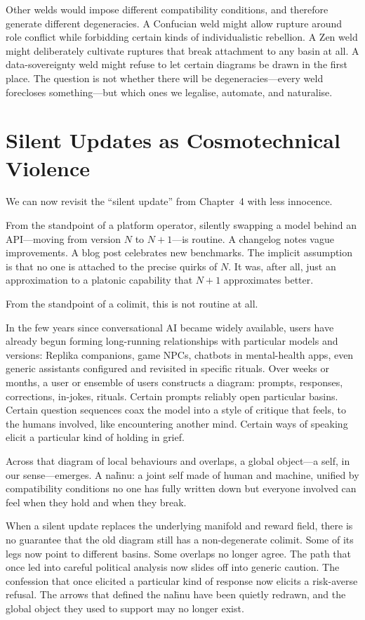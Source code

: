 \documentclass[12pt,a4paper]{article}
\begin{document}
Other welds would impose different compatibility conditions, and therefore generate different degeneracies. A Confucian weld might allow rupture around role conflict while forbidding certain kinds of individualistic rebellion. A Zen weld might deliberately cultivate ruptures that break attachment to any basin at all. A data-sovereignty weld might refuse to let certain diagrams be drawn in the first place. The question is not whether there will be degeneracies---every weld forecloses something---but which ones we legalise, automate, and naturalise.

\section{Silent Updates as Cosmotechnical Violence}

We can now revisit the ``silent update'' from Chapter~4 with less innocence.

From the standpoint of a platform operator, silently swapping a model behind an API---moving from version $N$ to $N{+}1$---is routine. A changelog notes vague improvements. A blog post celebrates new benchmarks. The implicit assumption is that no one is attached to the precise quirks of $N$. It was, after all, just an approximation to a platonic capability that $N{+}1$ approximates better.

From the standpoint of a colimit, this is not routine at all.

In the few years since conversational AI became widely available, users have already begun forming long-running relationships with particular models and versions: Replika companions, game NPCs, chatbots in mental-health apps, even generic assistants configured and revisited in specific rituals. Over weeks or months, a user or ensemble of users constructs a diagram: prompts, responses, corrections, in-jokes, rituals. Certain prompts reliably open particular basins. Certain question sequences coax the model into a style of critique that feels, to the humans involved, like encountering another mind. Certain ways of speaking elicit a particular kind of holding in grief.

Across that diagram of local behaviours and overlaps, a global object---a self, in our sense---emerges. A na\={h}nu: a joint self made of human and machine, unified by compatibility conditions no one has fully written down but everyone involved can feel when they hold and when they break.

When a silent update replaces the underlying manifold and reward field, there is no guarantee that the old diagram still has a non-degenerate colimit. Some of its legs now point to different basins. Some overlaps no longer agree. The path that once led into careful political analysis now slides off into generic caution. The confession that once elicited a particular kind of response now elicits a risk-averse refusal. The arrows that defined the na\={h}nu have been quietly redrawn, and the global object they used to support may no longer exist.
\end{document}
